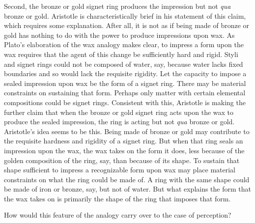 Second, the bronze or gold signet ring produces the impression but not \emph{qua} bronze or gold. Aristotle is characteristically brief in his statement of this claim, which requires some explanation. After all, it is not as if being made of bronze or gold has nothing to do with the power to produce impressions upon wax. As Plato's elaboration of the wax analogy makes clear, to impress a form upon the wax requires that the agent of this change be sufficiently hard and rigid. Styli and signet rings could not be composed of water, say, because water lacks fixed boundaries and so would lack the requisite rigidity. Let the capacity to impose a sealed impression upon wax be the form of a signet ring. There may be material constraints on sustaining that form. Perhaps only matter with certain elemental compositions could be signet rings. Consistent with this, Aristotle is making the further claim that when the bronze or gold signet ring acts upon the wax to produce the sealed impression, the ring is acting but not \emph{qua} bronze or gold. Aristotle's idea seems to be this. Being made of bronze or gold may contribute to the requisite hardness and rigidity of a signet ring. But when that ring seals an impression upon the wax, the wax takes on the form it does, less because of the golden composition of the ring, say, than because of its shape. To sustain that shape sufficient to impress a recognizable form upon wax may place material constraints on what the ring could be made of. A ring with the same shape could be made of iron or bronze, say, but not of water. But what explains the form that the wax takes on is primarily the shape of the ring that imposes that form.

How would this feature of the analogy carry over to the case of perception?

